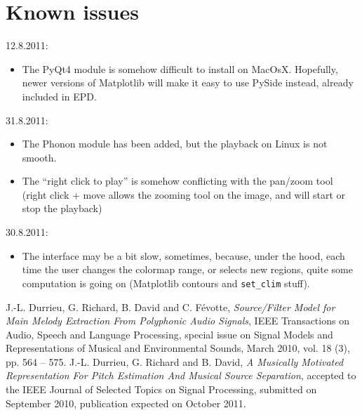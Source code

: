 \documentclass{article}
\begin{document}
\section{Known issues}
12.8.2011:
\begin{itemize}
\item The PyQt4 module is somehow difficult to install on MacOsX. Hopefully, newer versions of Matplotlib will make it easy to use PySide instead, already included in EPD. 
\end{itemize}
31.8.2011: 
\begin{itemize}
\item The Phonon module has been added, but the playback on Linux is 
      not smooth. 
\item The ``right click to play'' is somehow conflicting with the pan/zoom 
      tool (right click + move allows the zooming tool on the image, and 
      will start or stop the playback)
\end{itemize}

30.8.2011:
\begin{itemize}
\item The interface may be a bit slow, sometimes, because, under the hood, 
      each time the user changes the colormap range, or selects new regions,
      quite some computation is going on (Matplotlib contours and \texttt{set\_clim}
      stuff).
\end{itemize}

\begin{thebibliography}{99}
J.-L. Durrieu, G. Richard, B. David and C. F\'evotte, \emph{Source/Filter Model for Main Melody Extraction From Polyphonic Audio Signals}, IEEE Transactions on Audio, Speech and Language Processing, 
special issue on Signal Models and Representations of Musical and 
Environmental Sounds, March 2010, vol. 18 (3), pp. 564 -- 575.
 J.-L. Durrieu, G. Richard and B. David, \emph{A Musically Motivated Representation For Pitch Estimation 
And Musical Source Separation}, accepted to the IEEE Journal of Selected Topics on Signal Processing, 
submitted on September 2010, publication expected on October 2011.
\end{thebibliography}
\end{document}
